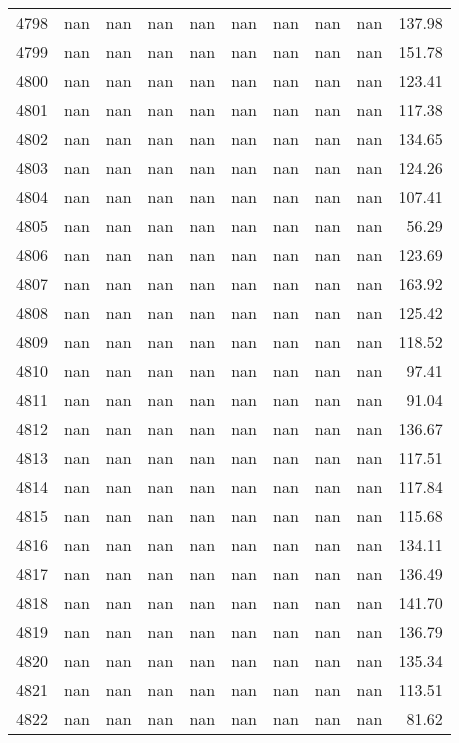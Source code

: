 \begin{tabular}{lrrrrrrrrr}
4798 & nan & nan & nan & nan & nan & nan & nan & nan & 137.98 \\
4799 & nan & nan & nan & nan & nan & nan & nan & nan & 151.78 \\
4800 & nan & nan & nan & nan & nan & nan & nan & nan & 123.41 \\
4801 & nan & nan & nan & nan & nan & nan & nan & nan & 117.38 \\
4802 & nan & nan & nan & nan & nan & nan & nan & nan & 134.65 \\
4803 & nan & nan & nan & nan & nan & nan & nan & nan & 124.26 \\
4804 & nan & nan & nan & nan & nan & nan & nan & nan & 107.41 \\
4805 & nan & nan & nan & nan & nan & nan & nan & nan & 56.29 \\
4806 & nan & nan & nan & nan & nan & nan & nan & nan & 123.69 \\
4807 & nan & nan & nan & nan & nan & nan & nan & nan & 163.92 \\
4808 & nan & nan & nan & nan & nan & nan & nan & nan & 125.42 \\
4809 & nan & nan & nan & nan & nan & nan & nan & nan & 118.52 \\
4810 & nan & nan & nan & nan & nan & nan & nan & nan & 97.41 \\
4811 & nan & nan & nan & nan & nan & nan & nan & nan & 91.04 \\
4812 & nan & nan & nan & nan & nan & nan & nan & nan & 136.67 \\
4813 & nan & nan & nan & nan & nan & nan & nan & nan & 117.51 \\
4814 & nan & nan & nan & nan & nan & nan & nan & nan & 117.84 \\
4815 & nan & nan & nan & nan & nan & nan & nan & nan & 115.68 \\
4816 & nan & nan & nan & nan & nan & nan & nan & nan & 134.11 \\
4817 & nan & nan & nan & nan & nan & nan & nan & nan & 136.49 \\
4818 & nan & nan & nan & nan & nan & nan & nan & nan & 141.70 \\
4819 & nan & nan & nan & nan & nan & nan & nan & nan & 136.79 \\
4820 & nan & nan & nan & nan & nan & nan & nan & nan & 135.34 \\
4821 & nan & nan & nan & nan & nan & nan & nan & nan & 113.51 \\
4822 & nan & nan & nan & nan & nan & nan & nan & nan & 81.62 \\

\end{tabular}
